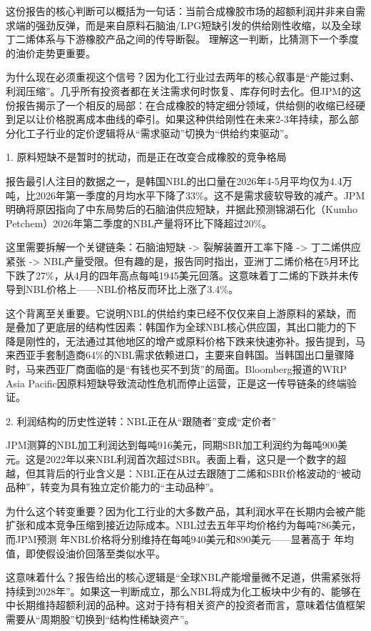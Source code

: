 \documentclass[11pt]{ctexart}
\begin{document}
这份报告的核心判断可以概括为一句话：当前合成橡胶市场的超额利润并非来自需求端的强劲反弹，而是来自原料石脑油/LPG短缺引发的供给刚性收缩，以及全球丁二烯体系与下游橡胶产品之间的传导断裂。 理解这一判断，比猜测下一个季度的油价走势更重要。

为什么现在必须重视这个信号？因为化工行业过去两年的核心叙事是“产能过剩、利润压缩”。几乎所有投资者都在关注需求何时恢复、库存何时去化。但JPM的这份报告揭示了一个相反的局部：在合成橡胶的特定细分领域，供给侧的收缩已经硬到足以让价格脱离成本曲线的牵引。如果这种供给刚性在未来2-3年持续，那么部分化工子行业的定价逻辑将从“需求驱动”切换为“供给约束驱动”。

1. 原料短缺不是暂时的扰动，而是正在改变合成橡胶的竞争格局

报告最引人注目的数据之一，是韩国NBL的出口量在2026年4-5月平均仅为4.4万吨，比2026年第一季度的月均水平下降了33\%。这不是需求疲软导致的减产。JPM明确将原因指向了中东局势后的石脑油供应短缺，并据此预测锦湖石化（Kumho Petchem）2026年第二季度的NBL产量将环比下降超过20\%。

这里需要拆解一个关键链条：石脑油短缺 -> 裂解装置开工率下降 -> 丁二烯供应紧张 -> NBL产量受限。但有趣的是，报告同时指出，亚洲丁二烯价格在5月环比下跌了27\%，从4月的四年高点每吨1945美元回落。这意味着丁二烯的下跌并未传导到NBL价格上——NBL价格反而环比上涨了3.4\%。

这个背离至关重要。它说明NBL的供给约束已经不仅仅来自上游原料的紧缺，而是叠加了更底层的结构性因素：韩国作为全球NBL核心供应国，其出口能力的下降是刚性的，无法通过其他地区的增产或原料价格下跌来快速弥补。报告提到，马来西亚手套制造商64\%的NBL需求依赖进口，主要来自韩国。当韩国出口量骤降时，马来西亚厂商面临的是“有钱也买不到货”的局面。Bloomberg报道的WRP Asia Pacific因原料短缺导致流动性危机而停止运营，正是这一传导链条的终端验证。

2. 利润结构的历史性逆转：NBL正在从“跟随者”变成“定价者”

JPM测算的NBL加工利润达到每吨916美元，同期SBR加工利润约为每吨900美元。这是2022年以来NBL利润首次超过SBR。表面上看，这只是一个数字的超越，但其背后的行业含义是：NBL正在从过去跟随丁二烯和SBR价格波动的“被动品种”，转变为具有独立定价能力的“主动品种”。

为什么这个转变重要？因为化工行业的大多数产品，其利润水平在长期内会被产能扩张和成本竞争压缩到接近边际成本。NBL过去五年平均价格约为每吨786美元，而JPM预测 年NBL价格将分别维持在每吨940美元和890美元——显著高于 年均值，即使假设油价回落至类似水平。

这意味着什么？报告给出的核心逻辑是“全球NBL产能增量微不足道，供需紧张将持续到2028年”。如果这一判断成立，那么NBL将成为化工板块中少有的、能够在中长期维持超额利润的品种。这对于持有相关资产的投资者而言，意味着估值框架需要从“周期股”切换到“结构性稀缺资产”。
\end{document}
